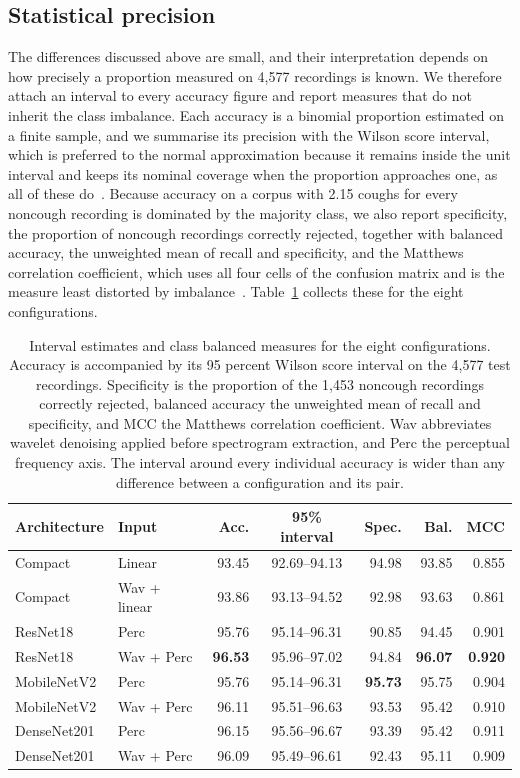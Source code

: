 \subsection{Statistical precision}\label{sec:res-precision}

The differences discussed above are small, and their interpretation depends on
how precisely a proportion measured on 4,577 recordings is known. We therefore
attach an interval to every accuracy figure and report measures that do not
inherit the class imbalance. Each accuracy is a binomial proportion estimated
on a finite sample, and we summarise its precision with the Wilson score
interval, which is preferred to the normal approximation because it remains
inside the unit interval and keeps its nominal coverage when the proportion
approaches one, as all of these do~\cite{brown2001}. Because accuracy on a
corpus with 2.15 coughs for every noncough recording is dominated by the
majority class, we also report specificity, the proportion of noncough
recordings correctly rejected, together with balanced accuracy, the unweighted
mean of recall and specificity, and the Matthews correlation coefficient,
which uses all four cells of the confusion matrix and is the measure least
distorted by imbalance~\cite{chicco2020}. Table~\ref{tab:interval} collects
these for the eight configurations.

\begin{table}[t]
\centering
\footnotesize
\caption{Interval estimates and class balanced measures for the eight
configurations. Accuracy is accompanied by its 95 percent Wilson score
interval on the 4,577 test recordings. Specificity is the proportion of the
1,453 noncough recordings correctly rejected, balanced accuracy the unweighted
mean of recall and specificity, and MCC the Matthews correlation coefficient.
Wav abbreviates wavelet denoising applied before spectrogram extraction, and
Perc the perceptual frequency axis. The interval around every individual
accuracy is wider than any difference between a configuration and its pair.}
\label{tab:interval}
\begin{tabular}{@{}llrcrrr@{}}
\toprule
Architecture & Input & Acc. & 95\% interval & Spec. & Bal. & MCC \\
\midrule
Compact & Linear & 93.45 & 92.69--94.13 & 94.98 & 93.85 & 0.855 \\
Compact & Wav + linear & 93.86 & 93.13--94.52 & 92.98 & 93.63 & 0.861 \\
ResNet18 & Perc & 95.76 & 95.14--96.31 & 90.85 & 94.45 & 0.901 \\
ResNet18 & Wav + Perc & \textbf{96.53} & 95.96--97.02 & 94.84 & \textbf{96.07} & \textbf{0.920} \\
MobileNetV2 & Perc & 95.76 & 95.14--96.31 & \textbf{95.73} & 95.75 & 0.904 \\
MobileNetV2 & Wav + Perc & 96.11 & 95.51--96.63 & 93.53 & 95.42 & 0.910 \\
DenseNet201 & Perc & 96.15 & 95.56--96.67 & 93.39 & 95.42 & 0.911 \\
DenseNet201 & Wav + Perc & 96.09 & 95.49--96.61 & 92.43 & 95.11 & 0.909 \\
\bottomrule
\end{tabular}
\end{table}

